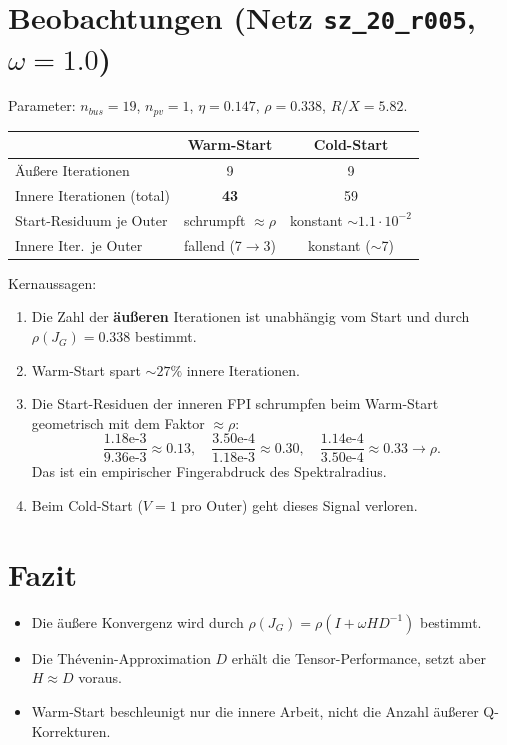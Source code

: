 \documentclass[11pt]{article}
\begin{document}
	\section{Beobachtungen (Netz \texttt{sz\_20\_r005}, $\omega=1.0$)}
	Parameter: $n_{bus}=19$, $n_{pv}=1$, $\eta=0.147$, $\rho=0.338$, $R/X=5.82$.
	\begin{table}[h]
		\centering
		\begin{tabular}{lcc}
			\toprule
			& Warm-Start & Cold-Start \\
			\midrule
			Äußere Iterationen        & 9 & 9 \\
			Innere Iterationen (total)& \textbf{43} & 59 \\
			Start-Residuum je Outer   & schrumpft $\approx \rho$ & konstant $\sim 1.1\cdot10^{-2}$ \\
			Innere Iter.\ je Outer    & fallend (7$\to$3) & konstant ($\sim$7) \\
			\bottomrule
		\end{tabular}
	\end{table}
	Kernaussagen:
	\begin{enumerate}
		\item Die Zahl der \textbf{äußeren} Iterationen ist unabhängig vom
		Start und durch $\rho(J_G)=0.338$ bestimmt.
		\item Warm-Start spart $\sim 27\%$ innere Iterationen.
		\item Die Start-Residuen der inneren FPI schrumpfen beim Warm-Start
		geometrisch mit dem Faktor $\approx \rho$:
		\begin{equation}
			\frac{1.18\text{e-}3}{9.36\text{e-}3}\approx 0.13,\quad
			\frac{3.50\text{e-}4}{1.18\text{e-}3}\approx 0.30,\quad
			\frac{1.14\text{e-}4}{3.50\text{e-}4}\approx 0.33 \to \rho.
		\end{equation}
		Das ist ein empirischer Fingerabdruck des Spektralradius.
		\item Beim Cold-Start ($V=1$ pro Outer) geht dieses Signal verloren.
	\end{enumerate}
	
	\section{Fazit}
	\begin{itemize}
		\item Die äußere Konvergenz wird durch $\rho(J_G) = \rho(I + \omega H D^{-1})$
		bestimmt.
		\item Die Thévenin-Approximation $D$ erhält die Tensor-Performance,
		setzt aber $H \approx D$ voraus.
		\item Warm-Start beschleunigt nur die innere Arbeit, nicht die Anzahl
		äußerer Q-Korrekturen.
	\end{itemize}
	
\end{document}
